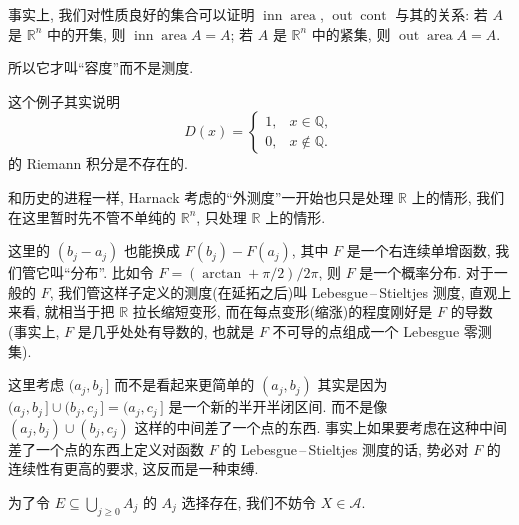 \begin{alterendnote}
    事实上, 我们对性质良好的集合可以证明 $\operatorname{inn}\operatorname{area}$, $\operatorname{out}\operatorname{cont}$ 与其的关系: 若 $A$ 是 $\mathbb R^n$ 中的开集, 则 $\operatorname{inn}\operatorname{area}A=A$; 若 $A$ 是 $\mathbb R^n$ 中的紧集, 则 $\operatorname{out}\operatorname{area}A=A$.
\end{alterendnote}
\begin{alterendnote}
    所以它才叫``容度''而不是测度.
\end{alterendnote}
\begin{alterendnote}
    这个例子其实说明 \[D(x)=
        \begin{cases}
            1, & x\in\mathbb Q,    \\
            0, & x\notin\mathbb Q.
        \end{cases}\] 的 Riemann 积分是不存在的.
\end{alterendnote}
\begin{alterendnote}
    和历史的进程一样, Harnack 考虑的``外测度''一开始也只是处理 $\mathbb R$ 上的情形, 我们在这里暂时先不管不单纯的 $\mathbb R^n$, 只处理 $\mathbb R$ 上的情形.
\end{alterendnote}
\begin{alterendnote}
    这里的 $(b_j-a_j)$ 也能换成 $F(b_j)-F(a_j)$, 其中 $F$ 是一个右连续单增函数, 我们管它叫``分布''. 比如令 $F=(\mathord{\arctan} + \pi /2)/2\pi $, 则 $F$ 是一个概率分布. 对于一般的 $F$, 我们管这样子定义的测度(在延拓之后)叫 Lebesgue\,--\,Stieltjes 测度, 直观上来看, 就相当于把 $\mathbb R$ 拉长缩短变形, 而在每点变形(缩涨)的程度刚好是 $F$ 的导数(事实上, $F$ 是几乎处处有导数的, 也就是 $F$ 不可导的点组成一个 Lebesgue 零测集).
\end{alterendnote}
\begin{alterendnote}
    这里考虑 $(a_j,b_j\,]$ 而不是看起来更简单的 $(a_j,b_j)$ 其实是因为 $(a_j,b_j\,]\cup (b_j,c_j\,]  = (a_j,c_j\,]$ 是一个新的半开半闭区间. 而不是像 $(a_j,b_j)\cup (b_j,c_j)$ 这样的中间差了一个点的东西. 事实上如果要考虑在这种中间差了一个点的东西上定义对函数 $F$ 的 Lebesgue\,--\,Stieltjes 测度的话, 势必对 $F$ 的连续性有更高的要求, 这反而是一种束缚.
\end{alterendnote}
\begin{alterendnote}
    为了令 $E\subseteq\bigcup_{j\geqslant 0}A_j$ 的 $A_j$ 选择存在, 我们不妨令 $X\in\mathscr A$.
\end{alterendnote}
